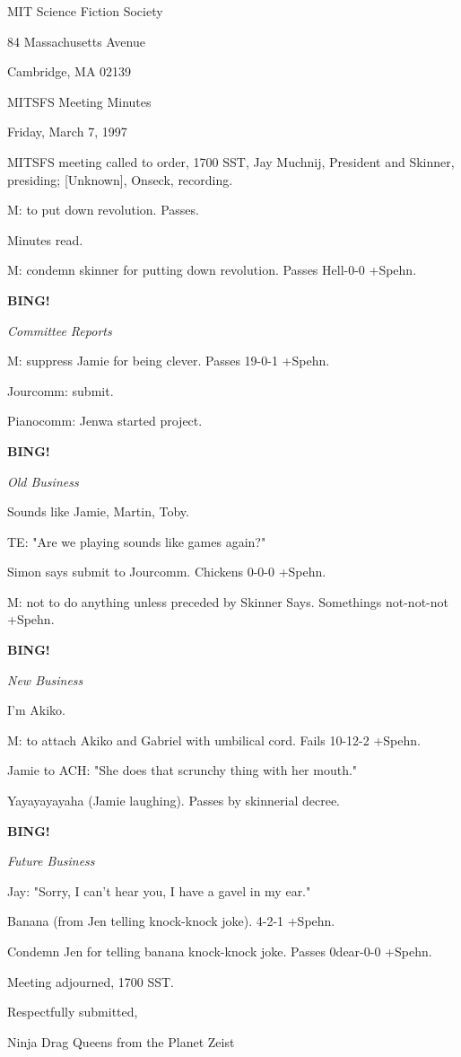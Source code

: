 \documentclass[12pt]{article}
\newcommand{\bing}{{\bf BING!} }
\newcommand{\goto}[1]{\bing \vskip 12pt \centerline{{\em{#1}}}}
\begin{document}
\begin{center}

MIT Science Fiction Society 

84 Massachusetts Avenue

Cambridge, MA 02139

\vspace{12pt}

MITSFS Meeting Minutes 

Friday, March 7, 1997

\end{center}
 
\vspace{18pt}

\setlength{\parskip}{6pt}

\noindent
MITSFS meeting called to order, 1700 SST,
Jay Muchnij, President and Skinner, presiding; [Unknown], Onseck, recording.

M: to put down revolution. Passes.

Minutes read.

M: condemn skinner for putting down revolution. Passes Hell-0-0 +Spehn.

\goto{Committee Reports}

M: suppress Jamie for being clever. Passes 19-0-1 +Spehn.

Jourcomm: submit.

Pianocomm: Jenwa started project.

\goto{Old Business}

Sounds like Jamie, Martin, Toby.

TE: "Are we playing sounds like games again?"

Simon says submit to Jourcomm. Chickens 0-0-0 +Spehn.

M: not to do anything unless preceded by Skinner Says. Somethings not-not-not +Spehn.

\goto{New Business}

I'm Akiko.

M: to attach Akiko and Gabriel with umbilical cord. Fails 10-12-2 +Spehn.

Jamie to ACH: "She does that scrunchy thing with her mouth."

Yayayayayaha (Jamie laughing). Passes by skinnerial decree.

\goto{Future Business}

Jay: "Sorry, I can't hear you, I have a gavel in my ear."

Banana (from Jen telling knock-knock joke). 4-2-1 +Spehn.

Condemn Jen for telling banana knock-knock joke. Passes 0dear-0-0 +Spehn.

\vspace{12pt}

\noindent
Meeting adjourned, 1700 SST.

\vspace{18pt}

\centerline{Respectfully submitted,}
\centerline{Ninja Drag Queens from the Planet Zeist}
\end{document}
